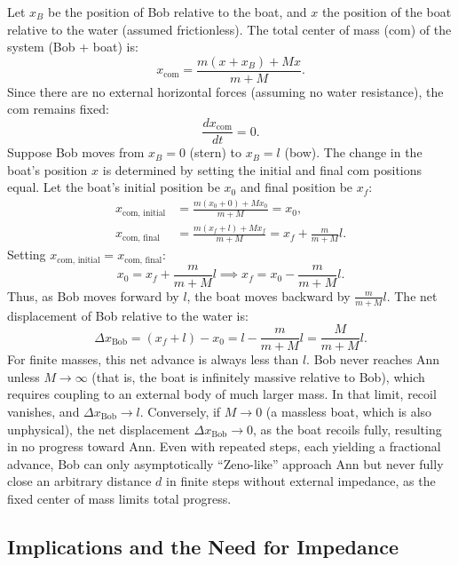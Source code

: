 \documentclass[reprint,aps,pra,superscriptaddress,longbibliography]{revtex4-2}
\begin{document}
Let $x_B$ be the position of Bob relative to the boat, and $x$ the position of the boat relative to the water (assumed frictionless). The total center of mass (com) of the system (Bob + boat) is:
\begin{equation}
    x_\text{com} = \frac{m (x + x_B) + M x}{m + M}.
\end{equation}
Since there are no external horizontal forces (assuming no water resistance), the com remains fixed:
\begin{equation}
    \frac{d x_\text{com}}{dt} = 0.
\end{equation}
Suppose Bob moves from $x_B = 0$ (stern) to $x_B = l$ (bow). The change in the boat's position $x$ is determined by setting the initial and final com positions equal. Let the boat's initial position be $x_0$ and final position be $x_f$:
\begin{align}
    x_\text{com, initial} &= \frac{m (x_0 + 0) + M x_0}{m + M} = x_0, \\
    x_\text{com, final} &= \frac{m (x_f + l) + M x_f}{m + M} = x_f + \frac{m}{m + M} l.
\end{align}
Setting $x_\text{com, initial} = x_\text{com, final}$:
\begin{equation}
    x_0 = x_f + \frac{m}{m + M} l \implies x_f = x_0 - \frac{m}{m + M} l.
\end{equation}
Thus, as Bob moves forward by $l$, the boat moves backward by $\frac{m}{m + M} l$. The net displacement of Bob relative to the water is:
\begin{equation}
    \Delta x_\text{Bob} = (x_f + l) - x_0 = l - \frac{m}{m + M} l = \frac{M}{m + M} l.
\end{equation}
For finite masses, this net advance is always less than $l$. Bob never reaches Ann unless $M \to \infty$ (that is, the boat is infinitely massive relative to Bob), which requires coupling to an external body of much larger mass. In that limit, recoil vanishes, and $\Delta x_\text{Bob} \to l$. Conversely, if $M \to 0$ (a massless boat, which is also unphysical), the net displacement $\Delta x_\text{Bob} \to 0$, as the boat recoils fully, resulting in no progress toward Ann. Even with repeated steps, each yielding a fractional advance, Bob can only asymptotically ``Zeno-like'' approach Ann but never fully close an arbitrary distance $d$ in finite steps without external impedance, as the fixed center of mass limits total progress.

\subsection{Implications and the Need for Impedance}
\end{document}
